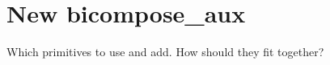 
\section{New bicompose\_aux}

Which primitives to use and add. How should they fit together?~\parencite{Wimmer2016}